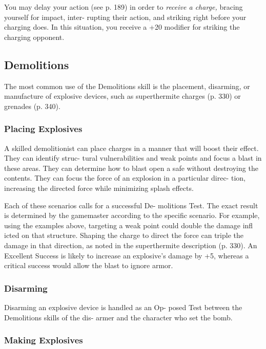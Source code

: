 You may delay your action (see p. 189) in order to 
\textit{receive a charge,} bracing yourself for impact, inter-
rupting their action, and striking right before your 
charging does. In this situation, you receive a +20 
modifier for striking the charging opponent.

\subsection{Demolitions}

The most common use of the Demolitions skill is the 
placement, disarming, or manufacture of explosive 
devices, such as superthermite charges (p. 330) or 
grenades (p. 340).

\subsubsection{Placing Explosives}

A skilled demolitionist can place charges in a manner 
that will boost their effect. They can identify struc-
tural vulnerabilities and weak points and focus a 
blast in these areas. They can determine how to blast 
open a safe without destroying the contents. They can 
focus the force of an explosion in a particular direc-
tion, increasing the directed force while minimizing 
splash effects.

Each of these scenarios calls for a successful De-
molitions Test. The exact result is determined by 
the gamemaster according to the specific  scenario. 
For example, using the examples above, targeting 
a weak point could double the damage infl icted on 
that structure. Shaping the charge to direct the force 
can triple the damage in that direction, as noted in 
the superthermite description (p. 330). An Excellent 
Success is likely to increase an explosive's damage by 
+5, whereas a critical success would allow the blast to 
ignore armor.

\subsubsection{Disarming}

Disarming an explosive device is handled as an Op-
posed Test between the Demolitions skills of the dis-
armer and the character who set the bomb.

\subsubsection{Making Explosives}


